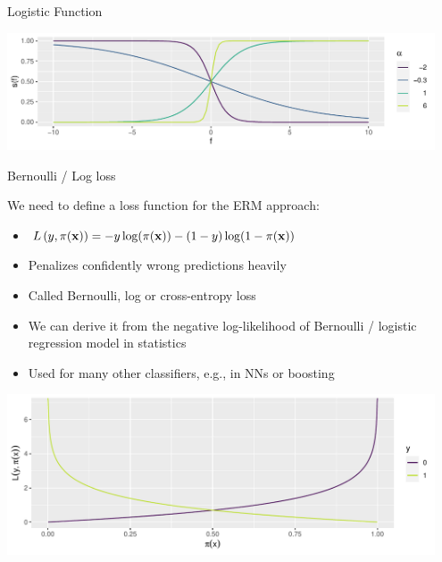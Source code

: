 \documentclass[11pt,compress,t,notes=noshow, xcolor=table]{beamer}
\begin{document}
\begin{vbframe}{Logistic Function}
\begin{knitrout}
{\centering \includegraphics[width=0.95\textwidth]{figure/reg_class_log_3} 

}



\end{knitrout}

\end{vbframe}

\begin{vbframe}{Bernoulli / Log loss}

We need to define a loss function for the ERM approach:

\begin{itemize}
  \item $L\left(y, \pi(\mathbf{x})\right) = -y\log(\pi(\mathbf{x}))-(1-y)\log(1-\pi(\mathbf{x}))$
  \item Penalizes confidently wrong predictions heavily
  \item Called Bernoulli, log or cross-entropy loss 
  \item We can derive it from the negative log-likelihood of Bernoulli / logistic regression model in statistics
  \item Used for many other classifiers, e.g., in NNs or boosting 
\end{itemize}


\begin{knitrout}\scriptsize
{}\color{fgcolor}

{\centering \includegraphics[width=0.95\textwidth]{figure/reg_class_log_4}  

}



\end{knitrout}

\end{vbframe}
\end{document}
